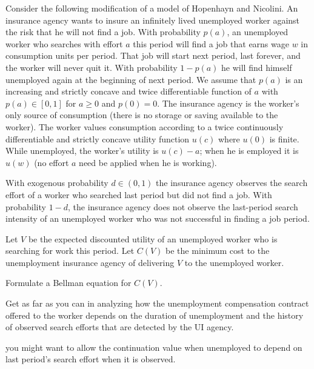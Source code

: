 \medskip
{}
\medskip
\noindent

\noindent Consider the following modification of a model of Hopenhayn and Nicolini.  An insurance agency wants to insure an infinitely lived unemployed
worker against the risk that he will not find a job.  With probability $p(a)$, an unemployed worker who searches with effort $a$ this period
will find a job that earns wage $w$ in consumption units per period. That job will start next period, last forever, and the worker will never quit it.    With probability $1-p(a)$ he will find himself unemployed again at the beginning of next period.  We assume that $p(a)$ is an increasing and strictly concave and twice differentiable function of $a$ with $p(a) \in [0,1]$
for $a\geq 0$ and $p(0)=0$.  The insurance agency is the worker's only source of consumption (there is no storage or saving available to the worker).
The worker values consumption according to a twice continuously differentiable and strictly concave utility function $u(c)$ where $u(0)$ is finite.
While unemployed, the worker's utility is $u(c) -a$; when he is employed it is $u(w)$ (no effort $a$ need be applied when he is working).


With exogenous probability $d \in (0,1)$ the insurance agency observes the search effort  of a worker who searched last period but did not find a job.
With probability $1-d$, the insurance agency  does not observe the last-period search intensity of an unemployed worker who was not successful in finding
a job  period.


Let $V$ be the expected discounted utility of an unemployed worker who is searching for work this period.  Let $C(V)$ be the minimum cost to the unemployment
insurance agency of delivering $V$ to the unemployed worker.

\medskip
{}  Formulate a Bellman equation for $C(V)$.

\medskip
{}  Get as far as you can in analyzing how the unemployment compensation contract offered to the worker depends on the duration
of unemployment and the history of observed search efforts that are detected by the UI agency.

\medskip

 you might want to allow the continuation value when unemployed to depend on last period's search effort when it is observed.



